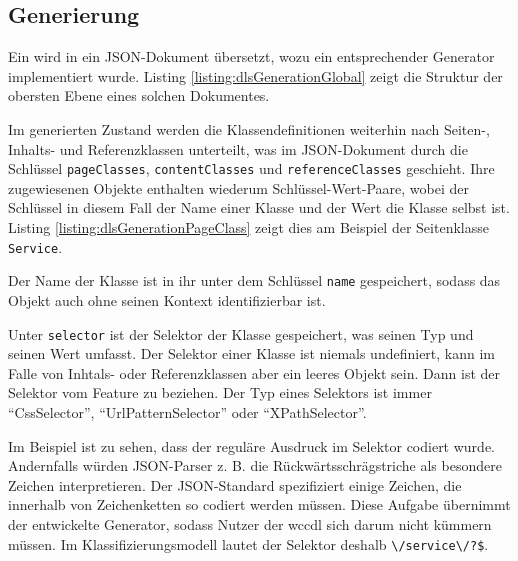 \subsection{Generierung}
    \label{section:solutionDetailsDslGeneration}
    Ein {\classificationModel} wird in ein JSON-Dokument übersetzt,
    wozu ein entsprechender Generator implementiert wurde.
    Listing \ref{listing:dlsGenerationGlobal} zeigt die Struktur der
    obersten Ebene eines solchen Dokumentes.

    

    Im generierten Zustand werden die Klassendefinitionen weiterhin nach
    Seiten-, Inhalts- und Referenzklassen unterteilt,
    was im JSON-Dokument durch die Schlüssel \texttt{pageClasses},
    \texttt{contentClasses} und \texttt{referenceClasses} geschieht.
    Ihre zugewiesenen Objekte enthalten wiederum Schlüssel-Wert-Paare,
    wobei der Schlüssel in diesem Fall der Name einer Klasse und der
    Wert die Klasse selbst ist.
    Listing \ref{listing:dlsGenerationPageClass} zeigt dies am Beispiel
    der Seitenklasse \texttt{Service}.

    

    Der Name der Klasse ist in ihr unter dem Schlüssel \texttt{name} gespeichert,
    sodass das Objekt auch ohne seinen Kontext identifizierbar ist.

    Unter \texttt{selector} ist der Selektor der Klasse gespeichert,
    was seinen Typ und seinen Wert umfasst.
    Der Selektor einer Klasse ist niemals undefiniert,
    kann im Falle von Inhtals- oder Referenzklassen aber ein leeres Objekt sein.
    Dann ist der Selektor vom Feature zu beziehen.
    Der Typ eines Selektors ist immer "`CssSelector"', "`UrlPatternSelector"' oder "`XPathSelector"'.

    Im Beispiel ist zu sehen, dass der reguläre Ausdruck im Selektor codiert wurde.
    Andernfalls würden JSON-Parser z. B. die Rückwärtsschrägstriche als besondere Zeichen interpretieren.
    Der JSON-Standard \cite[Kapitel 7]{rfc:8259} spezifiziert einige Zeichen,
    die innerhalb von Zeichenketten so codiert werden müssen.
    Diese Aufgabe übernimmt der entwickelte Generator,
    sodass Nutzer der \gls{wccdl} sich darum nicht kümmern müssen.
    Im Klassifizierungsmodell lautet der Selektor deshalb \verb+\/service\/?$+.

